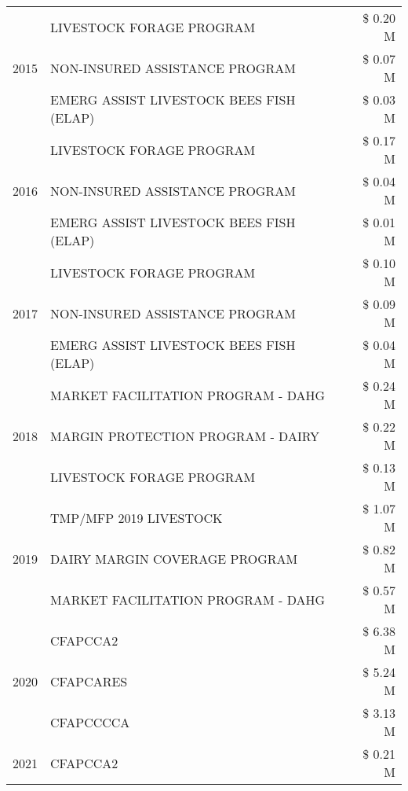 \begin{tabular}{llr}
\cline{1-3}
\multirow[t]{3}{*}{2015} & LIVESTOCK FORAGE PROGRAM & \$ 0.20 M \\
 & NON-INSURED ASSISTANCE PROGRAM & \$ 0.07 M \\
 & EMERG ASSIST LIVESTOCK BEES FISH (ELAP) & \$ 0.03 M \\
\cline{1-3}
\multirow[t]{3}{*}{2016} & LIVESTOCK FORAGE PROGRAM                      & \$ 0.17 M \\
 & NON-INSURED ASSISTANCE PROGRAM                & \$ 0.04 M \\
 & EMERG ASSIST LIVESTOCK BEES FISH (ELAP)       & \$ 0.01 M \\
\cline{1-3}
\multirow[t]{3}{*}{2017} & LIVESTOCK FORAGE PROGRAM & \$ 0.10 M \\
 & NON-INSURED ASSISTANCE PROGRAM & \$ 0.09 M \\
 & EMERG ASSIST LIVESTOCK BEES FISH (ELAP) & \$ 0.04 M \\
\cline{1-3}
\multirow[t]{3}{*}{2018} & MARKET FACILITATION PROGRAM - DAHG & \$ 0.24 M \\
 & MARGIN PROTECTION PROGRAM - DAIRY & \$ 0.22 M \\
 & LIVESTOCK FORAGE PROGRAM & \$ 0.13 M \\
\cline{1-3}
\multirow[t]{3}{*}{2019} & TMP/MFP 2019 LIVESTOCK & \$ 1.07 M \\
 & DAIRY MARGIN COVERAGE PROGRAM & \$ 0.82 M \\
 & MARKET FACILITATION PROGRAM - DAHG & \$ 0.57 M \\
\cline{1-3}
\multirow[t]{3}{*}{2020} & CFAPCCA2 & \$ 6.38 M \\
 & CFAPCARES & \$ 5.24 M \\
 & CFAPCCCCA & \$ 3.13 M \\
\cline{1-3}
2021 & CFAPCCA2 & \$ 0.21 M \\
\cline{1-3}
\bottomrule
\end{tabular}

